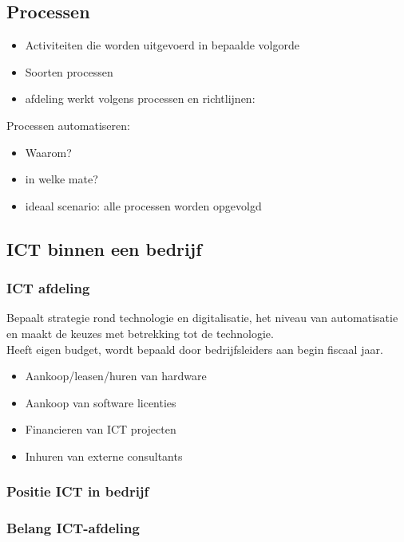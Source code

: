 \documentclass{article}
\begin{document}
\subsection{Processen}
\begin{itemize}
\item{Activiteiten die worden uitgevoerd in bepaalde volgorde}
\item{Soorten processen}
\item{afdeling werkt volgens processen en richtlijnen:}
\end{itemize}
Processen automatiseren:
\begin{itemize}
\item{Waarom?}
\item{in welke mate?}
\item{ideaal scenario: alle processen worden opgevolgd}
\end{itemize}
\subsection{ICT binnen een bedrijf}
\subsubsection{ICT afdeling}
Bepaalt strategie rond technologie en digitalisatie, het niveau van automatisatie en maakt de keuzes met betrekking tot de technologie.\\
Heeft eigen budget, wordt bepaald door bedrijfsleiders aan begin fiscaal jaar.\\
\begin{itemize}
\item{Aankoop/leasen/huren van hardware}
\item{Aankoop van software licenties}
\item{Financieren van ICT projecten}
\item{Inhuren van externe consultants}
\end{itemize}
\subsubsection{Positie ICT in bedrijf}

\subsubsection{Belang ICT-afdeling}
\end{document}
